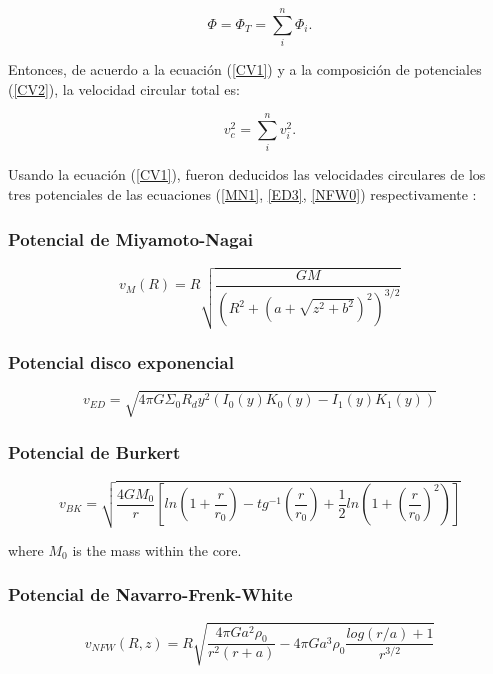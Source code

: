 \begin{equation}
\label{CV2}
 \Phi = \Phi_T = \sum_i^n \Phi_i.
\end{equation}

Entonces, de acuerdo a la ecuación (\ref{CV1}) y  a la composición de potenciales (\ref{CV2}), la velocidad circular total es:

\begin{equation}
\label{CV3}
v_{c}^2 = \sum_i^n v_i^2.
\end{equation}

Usando la ecuación (\ref{CV1}), fueron deducidos las velocidades circulares de los tres potenciales de las ecuaciones (\ref{MN1}, \ref{ED3}, \ref{NFW0}) respectivamente \cite{BT}:

\subsubsection{Potencial de Miyamoto-Nagai}
\begin{equation}
v_M (R) = R \sqrt{ \frac{GM}{ (R^2+(a+\sqrt{z^2+b^2})^2)^{3/2}}  }
\end{equation}

\subsubsection{Potencial disco exponencial}
\begin{equation}
v_{ED} = \sqrt{ 4\pi G \Sigma_0 R_d y^2 (I_0(y)K_0(y) - I_1(y)K_1(y)) }
\end{equation}

\subsubsection{Potencial de Burkert}
\begin{equation}
v_{BK} = \sqrt{ \frac{4GM_0}{r}  \left [ ln \left (1+\frac{r}{r_0} \right ) - tg^{-1} \left (\frac{r}{r_0} \right ) +\frac{1}{2} ln \left ( 1+\left (\frac{r}{r_0} \right )^2\right ) \right ] }
\end{equation}

where $M_0$ is the mass within the core.

\subsubsection{Potencial de Navarro-Frenk-White \cite{B15}}
\begin{equation}
v_{NFW} (R, z) = R \sqrt{   \frac{4\pi G a^2 \rho_0}{r^2(r+a)} - 4\pi G a^3 \rho_0\frac{log(r/a)+1}{r^{3/2}}  } 
\end{equation}

